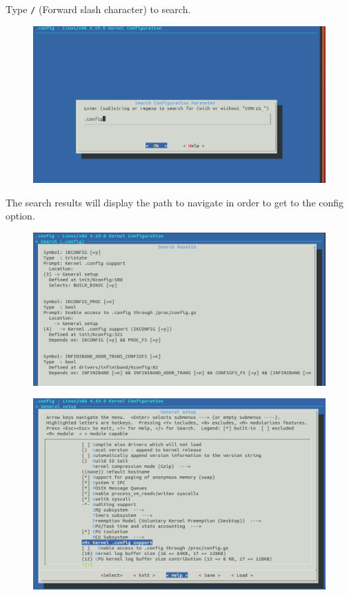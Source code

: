 \documentclass{beamer}
\begin{document}
\begin{frame}
  Type \texttt{/} (Forward slash character) to search.
  \begin{figure}
    \centering
    \includegraphics[scale=0.4]{images/proc-config-0-1.png}
  \end{figure}
\end{frame}

\begin{frame}
  The search results will display the path to navigate in order to get to the
  config option.
  \begin{figure}[h!]
    \centering
    \includegraphics[scale=0.4]{images/proc-config-0-2.png}
  \end{figure}
\end{frame}

\begin{frame}
  \begin{figure}[h!]
    \centering
    \includegraphics[scale=0.3]{images/proc-config-1.png}
  \end{figure}
\end{frame}
\end{document}
